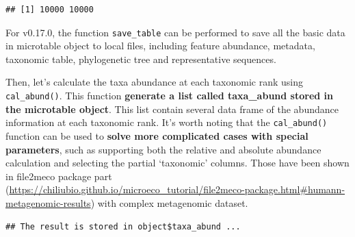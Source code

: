 \documentclass[
]{book}
\newenvironment{Shaded}{\begin{snugshade}}{\end{snugshade}}
\newcommand{\AttributeTok}[1]{\textcolor[rgb]{0.77,0.63,0.00}{#1}}
\newcommand{\CommentTok}[1]{\textcolor[rgb]{0.56,0.35,0.01}{\textit{#1}}}
\newcommand{\FunctionTok}[1]{\textcolor[rgb]{0.00,0.00,0.00}{#1}}
\newcommand{\NormalTok}[1]{#1}
\newcommand{\SpecialCharTok}[1]{\textcolor[rgb]{0.00,0.00,0.00}{#1}}
\newcommand{\StringTok}[1]{\textcolor[rgb]{0.31,0.60,0.02}{#1}}
\begin{document}
\begin{Shaded}
\end{Shaded}

\begin{verbatim}
## [1] 10000 10000
\end{verbatim}

For v0.17.0, the function \texttt{save\_table} can be performed to save all the basic data in microtable object to local files,
including feature abundance, metadata, taxonomic table, phylogenetic tree and representative sequences.

\begin{Shaded}
\end{Shaded}

Then, let's calculate the taxa abundance at each taxonomic rank using \texttt{cal\_abund()}.
This function \textbf{generate a list called taxa\_abund stored in the microtable object}.
This list contain several data frame of the abundance information at each taxonomic rank.
It's worth noting that the \texttt{cal\_abund()} function can be used to \textbf{solve more complicated cases with special parameters},
such as supporting both the relative and absolute abundance calculation and selecting the partial `taxonomic' columns.
Those have been shown in file2meco package part (\url{https://chiliubio.github.io/microeco_tutorial/file2meco-package.html\#humann-metagenomic-results}) with complex metagenomic dataset.

\begin{Shaded}
\end{Shaded}

\begin{verbatim}
## The result is stored in object$taxa_abund ...
\end{verbatim}
\end{document}
